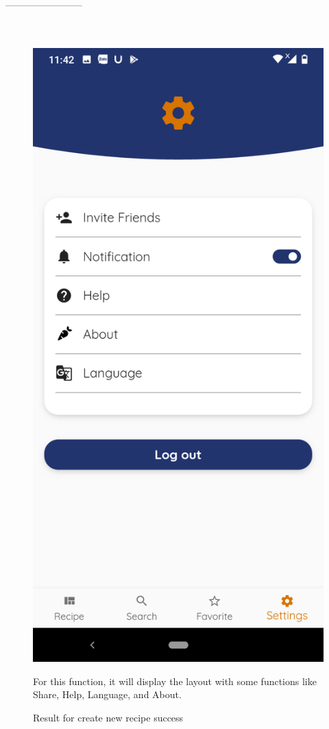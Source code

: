 \documentclass{article}
\begin{document}
       ------------------------\\ \\ \\
    \begin{figure}[h!]
    \centering
    \includegraphics[scale=0.1]{Images/Settings.jpg}
    \caption{Result for create new recipe success}
    For this function, it will display the layout with some functions like Share, Help, Language, and About.
    \label{fig:cookingbook}
    \end{figure}
\end{document}
